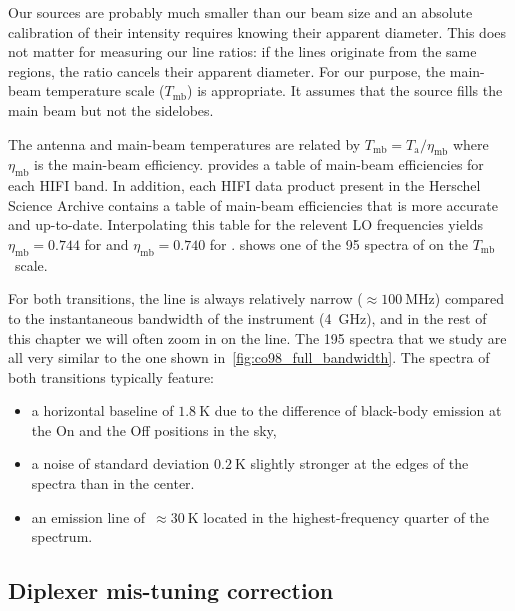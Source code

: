 Our sources are probably much smaller than our beam size and an absolute calibration of their intensity requires knowing their apparent diameter.
This does not matter for measuring our line ratios:
if the lines originate from the same regions, the ratio cancels their apparent diameter.
For our purpose, the main-beam temperature scale ($T_\text{mb}$) is appropriate.
It assumes that the source fills the main beam but not the sidelobes.

The antenna and main-beam temperatures are related by $T_\text{mb} = T_\text{a} / \eta_\text{mb}$ where $\eta_\text{mb}$ is the main-beam efficiency.
\Textcite{AA_537_A17} provides a table of main-beam efficiencies for each HIFI band.
In addition, each HIFI data product present in the Herschel Science Archive contains a table of main-beam efficiencies that is more accurate and up-to-date.
Interpolating this table for the relevent LO frequencies yields
$\eta_\text{mb}=\num{0.744}$ for  and $\eta_\text{mb}=\num{0.740}$ for .
 shows one of the 95 spectra of  on the $T_\text{mb}$~scale.

For both transitions, the  line is always relatively narrow ($\approx \SI{100}{\mega\hertz}$) compared to the instantaneous bandwidth of the instrument (\SI{4}{\giga\hertz}), and in the rest of this chapter we will often zoom in on the line.
The 195 spectra that we study are all very similar to the one shown in~\cref{fig:co98_full_bandwidth}.
The spectra of both transitions typically feature:
\begin{itemize}[noitemsep,nolistsep]
    \item a horizontal baseline of $\SI{1.8}{\kelvin}$ due to the difference of black-body emission at the On and the Off positions in the sky,
    \item a noise of standard deviation $\SI{0.2}{\kelvin}$ slightly stronger at the edges of the spectra than in the center.
    \item an emission line of~$\approx \SI{30}{\kelvin}$ located in the highest-frequency quarter of the spectrum.
\end{itemize}




\subsection{Diplexer mis-tuning correction}

